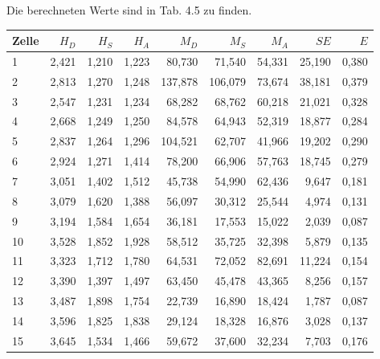 Die berechneten Werte sind in Tab. 4.5 zu finden.



\begin{center}
    \centering
    \begin{tabular}{lrrrrrrrr}
        \toprule
        Zelle &  $H_D$ &  $H_S$ &  $H_A$ &    $M_D$ &    $M_S$ &   $M_A$ &     $SE$ &     $E$ \\
        \midrule
        1     & 2,421 & 1,210 & 1,223 &  80,730 &  71,540 & 54,331 & 25,190 & 0,380 \\
        2     & 2,813 & 1,270 & 1,248 & 137,878 & 106,079 & 73,674 & 38,181 & 0,379 \\
        3     & 2,547 & 1,231 & 1,234 &  68,282 &  68,762 & 60,218 & 21,021 & 0,328 \\
        4     & 2,668 & 1,249 & 1,250 &  84,578 &  64,943 & 52,319 & 18,877 & 0,284 \\
        5     & 2,837 & 1,264 & 1,296 & 104,521 &  62,707 & 41,966 & 19,202 & 0,290 \\
        6     & 2,924 & 1,271 & 1,414 &  78,200 &  66,906 & 57,763 & 18,745 & 0,279 \\
        7     & 3,051 & 1,402 & 1,512 &  45,738 &  54,990 & 62,436 &  9,647 & 0,181 \\
        8     & 3,079 & 1,620 & 1,388 &  56,097 &  30,312 & 25,544 &  4,974 & 0,131 \\
        9     & 3,194 & 1,584 & 1,654 &  36,181 &  17,553 & 15,022 &  2,039 & 0,087 \\
        10    & 3,528 & 1,852 & 1,928 &  58,512 &  35,725 & 32,398 &  5,879 & 0,135 \\
        11    & 3,323 & 1,712 & 1,780 &  64,531 &  72,052 & 82,691 & 11,224 & 0,154 \\
        12    & 3,390 & 1,397 & 1,497 &  63,450 &  45,478 & 43,365 &  8,256 & 0,157 \\
        13    & 3,487 & 1,898 & 1,754 &  22,739 &  16,890 & 18,424 &  1,787 & 0,087 \\
        14    & 3,596 & 1,825 & 1,838 &  29,124 &  18,328 & 16,876 &  3,028 & 0,137 \\
        15    & 3,645 & 1,534 & 1,466 &  59,672 &  37,600 & 32,234 &  7,703 & 0,176 \\
        \bottomrule
    \end{tabular}
    \label{tab:CY}
\end{center}

